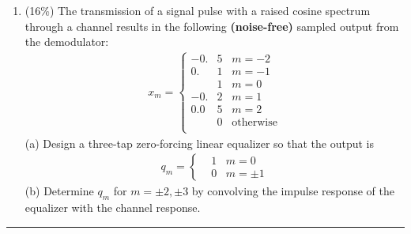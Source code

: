 \documentclass[a4paper,12pt]{article}
\begin{document}
\begin{enumerate}
            (c) If Huffman codes were designed for the second extension of these sources (i.e., two letters at a time), for which source X or Y would you expect a performance improvement compared to the single-letter Huffman code and why? \\ 
        \item (16\%)
            The transmission of a signal pulse with a raised cosine spectrum through a channel results in the following \textbf{(noise-free)} sampled output from the demodulator: 
            \begin{align*}
                x_m = \left\{
                \begin{aligned}
                    -0.&5 \;\;\; m = -2 \\ 
                     0.&1 \;\;\; m = -1 \\ 
                       &1 \;\;\; m = 0 \\ 
                    -0.&2 \;\;\; m = 1 \\ 
                    0.0&5 \;\;\; m = 2 \\ 
                       &0 \;\;\; \text{otherwise} \\ 
                \end{aligned}
                \right.
            \end{align*}
            (a) Design a three-tap zero-forcing linear equalizer so that the output is 
            \begin{align*}
                q_m = \left\{
                \begin{aligned}
                    & 1 \;\;\; m = 0 \\ 
                    & 0 \;\;\; m = \pm 1 
                \end{aligned}
                \right.
            \end{align*}
            (b) Determine $q_m$ for $m = \pm 2, \pm 3$ by convolving the impulse response of the equalizer with the channel response. \\ 
    \end{enumerate}
    \rule{\textwidth}{0.4pt}
\end{document}
